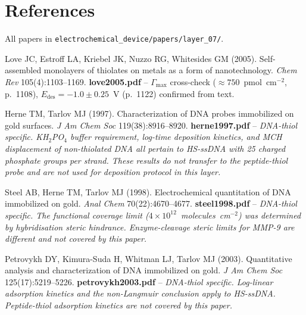\documentclass[10pt,a4paper]{article}
\numberwithin{equation}{section}
\begin{document}
\begin{enumerate}[noitemsep]
\end{enumerate}

\section*{References}

\noindent All papers in \texttt{electrochemical\_device/papers/layer\_07/}.

\begin{enumerate}[label={[\arabic*]},noitemsep,leftmargin=*]

\item Love JC, Estroff LA, Kriebel JK, Nuzzo RG, Whitesides GM (2005). Self-assembled
  monolayers of thiolates on metals as a form of nanotechnology.
  \textit{Chem Rev} 105(4):1103--1169.
  \textbf{love2005.pdf} -- $\Gamma_{\max}$ cross-check
  ($\approx 750$~pmol~cm$^{-2}$, p.~1108), $E_{\mathrm{des}} = -1.0 \pm 0.25$~V
  (p.~1122) confirmed from text.

\item Herne TM, Tarlov MJ (1997). Characterization of DNA probes immobilized on gold surfaces.
  \textit{J Am Chem Soc} 119(38):8916--8920.
  \textbf{herne1997.pdf} -- \textit{DNA-thiol specific. KH$_2$PO$_4$ buffer requirement,
  log-time deposition kinetics, and MCH displacement of non-thiolated DNA all pertain to
  HS-ssDNA with 25 charged phosphate groups per strand. These results do not transfer to
  the peptide-thiol probe and are not used for deposition protocol in this layer.}

\item Steel AB, Herne TM, Tarlov MJ (1998). Electrochemical quantitation of DNA immobilized
  on gold.
  \textit{Anal Chem} 70(22):4670--4677.
  \textbf{steel1998.pdf} -- \textit{DNA-thiol specific. The functional coverage limit
  ($4 \times 10^{12}$~molecules~cm$^{-2}$) was determined by hybridisation steric
  hindrance. Enzyme-cleavage steric limits for MMP-9 are different and not covered
  by this paper.}

\item Petrovykh DY, Kimura-Suda H, Whitman LJ, Tarlov MJ (2003). Quantitative analysis and
  characterization of DNA immobilized on gold.
  \textit{J Am Chem Soc} 125(17):5219--5226.
  \textbf{petrovykh2003.pdf} -- \textit{DNA-thiol specific. Log-linear adsorption kinetics
  and the non-Langmuir conclusion apply to HS-ssDNA. Peptide-thiol adsorption kinetics are
  not covered by this paper.}


\end{enumerate}
\end{document}
